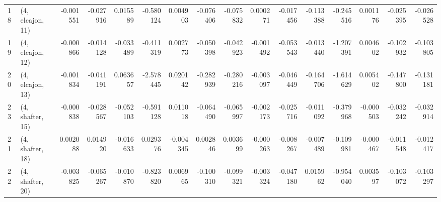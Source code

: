 \begin{tabular}{llrrrrrrrrrrrrrr}
18 &  (4, elcajon, 11) &  -0.001551 & -0.027916 &  0.015589 &  -0.580124 &  0.004903 &  -0.076406 & -0.075832 &  0.000271 & -0.017456 & -0.113388 &  -0.245516 &  0.001176 & -0.025395 & -0.026528 \\
19 &  (4, elcajon, 12) &  -0.000866 & -0.014128 & -0.033489 &  -0.411319 &  0.002773 &  -0.050398 & -0.042923 & -0.001492 & -0.053543 & -0.013440 &  -1.207391 &  0.004602 & -0.102932 & -0.103805 \\
20 &  (4, elcajon, 13) &  -0.001834 & -0.041191 &  0.063657 &  -2.578445 &  0.020142 &  -0.282939 & -0.280216 & -0.003097 & -0.046449 & -0.164706 &  -1.614629 &  0.005402 & -0.147800 & -0.131181 \\
23 &  (4, shafter, 15) &  -0.000838 & -0.028567 & -0.052103 &  -0.591128 &  0.011018 &  -0.064490 & -0.065997 & -0.002173 & -0.025716 & -0.011092 &  -0.379968 & -0.000503 & -0.032242 & -0.032914 \\
21 &  (4, shafter, 18) &   0.002088 &  0.014920 & -0.016633 &   0.029376 & -0.004345 &   0.002846 &  0.003699 & -0.000263 & -0.008267 & -0.007489 &  -0.109981 & -0.000467 & -0.011548 & -0.012417 \\
22 &  (4, shafter, 20) &  -0.003825 & -0.065267 & -0.010870 &  -0.823820 &  0.006965 &  -0.100310 & -0.099321 & -0.003324 & -0.047180 &  0.015962 &  -0.954040 &  0.003597 & -0.103072 & -0.103297 \\
\bottomrule
\end{tabular}
